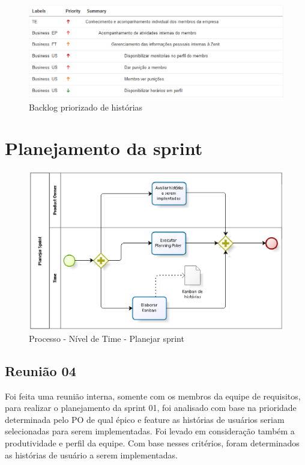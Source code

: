 \begin{figure}[H]
    \centering
    \includegraphics[keepaspectratio=true,scale=0.6]{figuras/blus08.eps}
    \caption[Backlog história]{Backlog priorizado de histórias\label{backlogus08}}
\end{figure}

\section{Planejamento da sprint}

\begin{figure}[H]
    \centering
    \label{identificarPlanejar}
    \includegraphics[keepaspectratio=true,scale=0.6]{figuras/processoPlanejar.eps}
    \caption[Planejar sprint]{Processo - Nível de Time - Planejar sprint}
\end{figure}

\subsection{Reunião 04}

Foi feita uma reunião interna, somente com os membros da equipe de requisitos, para realizar o planejamento da sprint 01, foi analisado com base na prioridade determinada pelo PO de qual épico e feature as histórias de usuários seriam selecionadas para serem implementadas. Foi levado em consideração também a produtividade e perfil da equipe. Com base nesses critérios, foram determinados as histórias de usuário a serem implementadas. 

